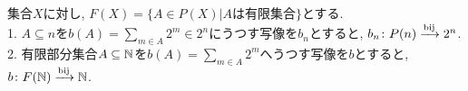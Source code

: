 \begin{proposition}[p188の命題7.1.8]
  集合$X$に対し,
  $F(X) = \{A \in P(X) | Aは有限集合\}$とする.\\
  1. $A \subseteq n$を$b(A) = \sum _{m \in A} 2^m \in 2^n$にうつす写像を$b_n$とすると,
  $b_n\colon P(n) \xrightarrow{\text{bij}} 2^n$.\\
  2. 有限部分集合$A \subseteq \mathbb{N}$を$b(A) = \sum _{m \in A} 2^m$へうつす写像を$b$とすると,
  $b\colon F(\mathbb{N}) \xrightarrow{\text{bij}} \mathbb{N}$.\\
\end{proposition}
